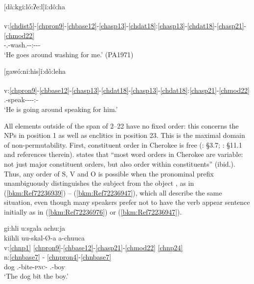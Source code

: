 \documentclass[output=paper]{langscibook}
\begin{document}
\ea\label{bkm:Ref72232545}[dà:kgi:ló:ʔe:l]ǐ:dô:ha \\
\\
v:\ref{chdist5}-\ref{chpron9}-\ref{chbase12}-\ref{chasp13}-\ref{chdat18}:\ref{chasp13}-\ref{chdat18}-\ref{chasp21}-\ref{chmod22}\\
\Dist-\First\Sg.\Barg{}-wash.\Fl{}-\Prf{}-\Dat:\Prf{}-\Amb{}-\Prs{}-\Ind\\
\glt `He goes around washing for me.' (PA1971)
\z 


\ea\label{bkm:Ref72232554}[gawó:ni:his]ǐ:dô:leha \\
\\
v:\ref{chpron9}-\ref{chbase12}-\ref{chasp13}-\ref{chdat18}-\ref{chasp13}-\ref{chdat18}:\ref{chasp21}-\ref{chmod22}\\
\Third\Sg.\Aarg{}-speak-\Prf{}-\Amb{}-\Prf{}-\Dat{}:\Prs-\Ind{}\\ 
\glt `He is going around speaking for him.' \citep[319]{Feeling1975}
\z 

All elements outside of the span of 2--22 have no fixed order: this concerns the NPs in position 1 as well as enclitics in position 23. This is the maximal domain of non-permutability. First, constituent order in Cherokee is free (\citealt{Scancarelli1987}: \S 3.7; \citeyear{Montgomery-Anderson2015}: \S 11.1 and references therein). \citet{Scancarelli1987} states that “most word orders in Cherokee are variable: not just major constituent orders, but also order within constituents” (ibid.). Thus, any order of S, V and O is possible when the pronominal prefix unambiguously distinguishes the subject from the object \citep[189]{Scancarelli1987}, as in (\ref{bkm:Ref72236939}) – (\ref{bkm:Ref72236947}), which all describe the same situation, even though many speakers prefer not to have the verb appear sentence initially as in (\ref{bkm:Ref72236976}) or (\ref{bkm:Ref72236947}).

\ea\label{bkm:Ref72236939}gi:hli u:sgala achu:ja \\
\gllll kiihli uu-skal-Ø{}-a a-chuuca \\
v:\ref{chnp1} \ref{chpron9}-\ref{chbase12}-\ref{chasp21}-\ref{chmod22} \ref{chnp24}\\
n:\ref{chnbase7} -  \ref{chnpron4}-\ref{chnbase7}\\ 
dog \Third\Sg.\Barg{}-bite-\textsc{pnc}-\Ind{} \Third\Sg.\Aarg{}-boy\\
\glt `The dog bit the boy.' \citep[189]{Scancarelli1987}
\z 
\end{document}
